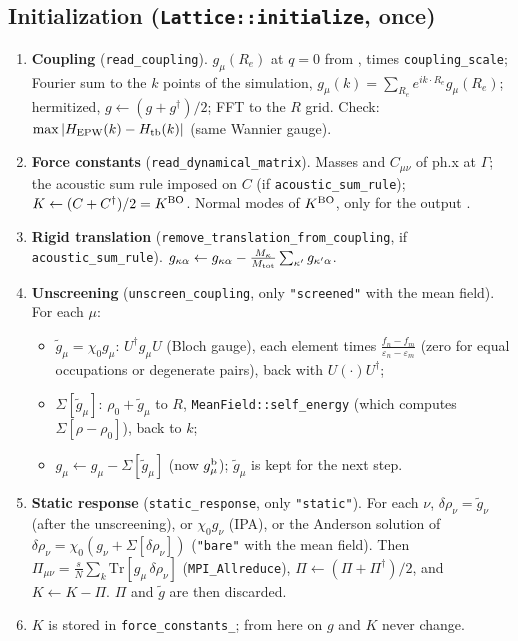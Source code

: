 \documentclass[11pt]{article}
\newcommand{\gb}{g^{\rm b}}
\newcommand{\KBO}{K^{\rm BO}}
\begin{document}
\subsection*{Initialization (\texttt{Lattice::initialize}, once)}
\begin{enumerate}
\item \textbf{Coupling} (\texttt{read\_coupling}). $g_\mu(R_e)$ at $q=0$ from , times
  \texttt{coupling\_scale}; Fourier sum to the $k$ points of the simulation, $g_\mu(k)=\sum_{R_e}e^{ik\cdot R_e}g_\mu(R_e)$;
  hermitized, $g\leftarrow(g+g^\dagger)/2$; FFT to the $R$ grid. Check: $\max|H_{\rm EPW}(k)-H_{\rm tb}(k)|$ (same
  Wannier gauge).
\item \textbf{Force constants} (\texttt{read\_dynamical\_matrix}). Masses and $C_{\mu\nu}$ of ph.x at $\Gamma$; the
  acoustic sum rule imposed on $C$ (if \texttt{acoustic\_sum\_rule}); $K\leftarrow (C+C^\dagger)/2 = \KBO$. Normal modes
  of $\KBO$, only for the output .
\item \textbf{Rigid translation} (\texttt{remove\_translation\_from\_coupling}, if \texttt{acoustic\_sum\_rule}).
  $g_{\kappa\alpha}\leftarrow g_{\kappa\alpha}-\frac{M_\kappa}{M_{\rm tot}}\sum_{\kappa'}g_{\kappa'\alpha}$.
\item \textbf{Unscreening} (\texttt{unscreen\_coupling}, only \texttt{"screened"} with the mean field). For each $\mu$:
  \begin{itemize}
  \item $\tilde g_\mu = \chi_0 g_\mu$: $U^\dagger g_\mu U$ (Bloch gauge), each element times
    $\frac{f_n-f_m}{\varepsilon_n-\varepsilon_m}$ (zero for equal occupations or degenerate pairs), back with
    $U(\cdot)U^\dagger$;
  \item $\Sigma[\tilde g_\mu]$: $\rho_0+\tilde g_\mu$ to $R$, \texttt{MeanField::self\_energy} (which computes
    $\Sigma[\rho-\rho_0]$), back to $k$;
  \item $g_\mu \leftarrow g_\mu - \Sigma[\tilde g_\mu]$ (now $\gb_\mu$); $\tilde g_\mu$ is kept for the next step.
  \end{itemize}
\item \textbf{Static response} (\texttt{static\_response}, only \texttt{"static"}). For each $\nu$,
  $\delta\rho_\nu = \tilde g_\nu$ (after the unscreening), or $\chi_0 g_\nu$ (IPA), or the Anderson solution of
  $\delta\rho_\nu=\chi_0(g_\nu+\Sigma[\delta\rho_\nu])$ (\texttt{"bare"} with the mean field). Then
  $\Pi_{\mu\nu} = \frac{s}{N}\sum_k\mathrm{Tr}[g_\mu\,\delta\rho_\nu]$ (\texttt{MPI\_Allreduce}),
  $\Pi\leftarrow(\Pi+\Pi^\dagger)/2$, and $K\leftarrow K-\Pi$. $\Pi$ and $\tilde g$ are then discarded.
\item $K$ is stored in \texttt{force\_constants\_}; from here on $g$ and $K$ never change.
\end{enumerate}
\end{document}
